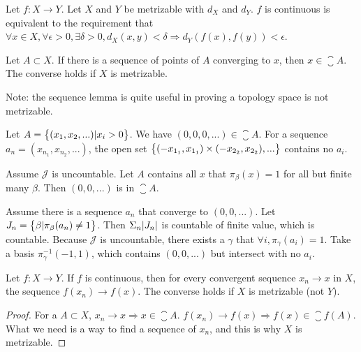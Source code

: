 \begin{theorem}
Let $f: X \rightarrow Y$. Let $X$ and $Y$ be metrizable with $d_X$ and $d_Y$. $f$ is continuous is equivalent to the requirement that $\forall x \in X, \forall \epsilon > 0, \exists \delta > 0, d_X (x,y) < \delta \Rightarrow d_Y \left(f(x), f(y) \right) < \epsilon $.
\end{theorem}

\begin{theorem}
    Let $A \subset X$. If there is a sequence of points of $A$ converging to $x$, then $x \in \closure{A}$. The converse holds if $X$ is metrizable.
\end{theorem}
Note: the sequence lemma is quite useful in proving a topology space is not metrizable.

\begin{example}
    Let $A = \set{(x_1, x_2, ... ) | x_i > 0}$. We have $(0,0,0,...) \in \closure{A}$. For a sequence $a_n = (x_{n_1}, x_{n_2}, ...)$, the open set $\set{(- x_{1_1}, x_{1_1}) \times (- x_{2_2}, x_{2_2}), ...}$ contains no $a_i$.
\end{example}

\begin{example}
    Assume $\mathcal{J}$ is uncountable. Let $A$ contains all $x$ that $\pi_{\beta}(x) = 1$ for all but finite many $\beta$. Then $(0,0,...)$ is in $\closure{A}$.
    
    Assume there is a sequence $a_n$ that converge to $(0,0,...)$. Let $J_n = \set{\beta | \pi_\beta (a_n) \neq 1 }$. Then $\Sigma_n \abs{J_n}$ is countable of finite value, which is countable. Because $\mathcal{J}$ is uncountable, there exists a $\gamma$ that $\forall i, \pi_\gamma (a_i) = 1$. Take a basis $\pi_{\gamma}^{-1}(-1,1)$, which contains $(0,0,...)$ but intersect with no $a_i$.
\end{example}



\begin{theorem}
    Let $f: X \rightarrow Y$. If $f$ is continuous, then for every convergent sequence $x_n \rightarrow x$ in $X$, the sequence $f(x_n) \rightarrow f(x)$. The converse holds if $X$ is metrizable (not $Y$).
\end{theorem}
\begin{proof}
    For a $A \subset X$,  $x_n \rightarrow x \Rightarrow x \in \closure{A}$. $f(x_n) \rightarrow f(x) \Rightarrow f(x) \in \closure{f(A)}$. What we need is a way to find a sequence of $x_n$, and this is why $X$ is metrizable.
\end{proof}


